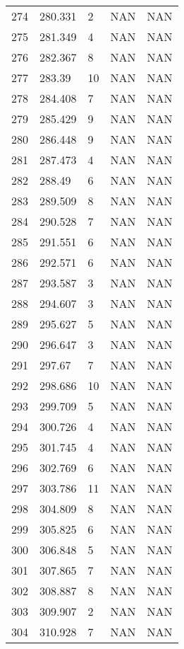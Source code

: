 \documentclass{article}
\begin{document}
\begin{longtable}{@{}lllll@{}}
				274 & 280.331 & 2     & NAN   & NAN   \\
				275 & 281.349 & 4     & NAN   & NAN   \\
				276 & 282.367 & 8     & NAN   & NAN   \\
				277 & 283.39  & 10    & NAN   & NAN   \\
				278 & 284.408 & 7     & NAN   & NAN   \\
				279 & 285.429 & 9     & NAN   & NAN   \\
				280 & 286.448 & 9     & NAN   & NAN   \\
				281 & 287.473 & 4     & NAN   & NAN   \\
				282 & 288.49  & 6     & NAN   & NAN   \\
				283 & 289.509 & 8     & NAN   & NAN   \\
				284 & 290.528 & 7     & NAN   & NAN   \\
				285 & 291.551 & 6     & NAN   & NAN   \\
				286 & 292.571 & 6     & NAN   & NAN   \\
				287 & 293.587 & 3     & NAN   & NAN   \\
				288 & 294.607 & 3     & NAN   & NAN   \\
				289 & 295.627 & 5     & NAN   & NAN   \\
				290 & 296.647 & 3     & NAN   & NAN   \\
				291 & 297.67  & 7     & NAN   & NAN   \\
				292 & 298.686 & 10    & NAN   & NAN   \\
				293 & 299.709 & 5     & NAN   & NAN   \\
				294 & 300.726 & 4     & NAN   & NAN   \\
				295 & 301.745 & 4     & NAN   & NAN   \\
				296 & 302.769 & 6     & NAN   & NAN   \\
				297 & 303.786 & 11    & NAN   & NAN   \\
				298 & 304.809 & 8     & NAN   & NAN   \\
				299 & 305.825 & 6     & NAN   & NAN   \\
				300 & 306.848 & 5     & NAN   & NAN   \\
				301 & 307.865 & 7     & NAN   & NAN   \\
				302 & 308.887 & 8     & NAN   & NAN   \\
				303 & 309.907 & 2     & NAN   & NAN   \\
				304 & 310.928 & 7     & NAN   & NAN   \\

\end{longtable}
\end{document}
